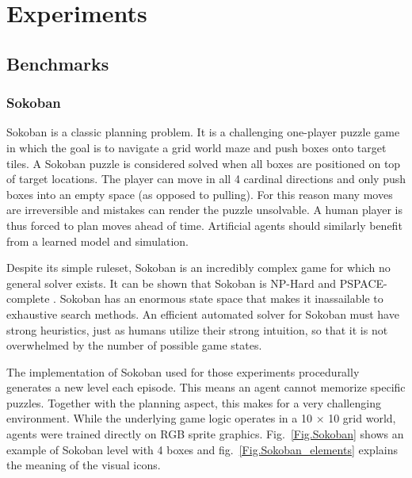 \section{Experiments}

\subsection{Benchmarks}

\subsubsection{Sokoban}

Sokoban is a classic planning problem. It is a challenging one-player puzzle game in which the goal is to navigate a grid world maze and push boxes onto target tiles. A Sokoban puzzle is considered solved when all boxes are positioned on top of target locations. The player can move in all 4 cardinal directions and only push boxes into an empty space (as opposed to pulling). For this reason many moves are irreversible and mistakes can render the puzzle unsolvable. A human player is thus forced to plan moves ahead of time. Artificial agents should similarly benefit from a learned model and simulation.

Despite its simple ruleset, Sokoban is an incredibly complex game for which no general solver exists. It can be shown that Sokoban is NP-Hard and PSPACE-complete\cite{Theory.Sokoban} . Sokoban has an enormous state space that makes it inassailable to exhaustive search methods. An efficient automated solver for Sokoban must have strong heuristics, just as humans utilize their strong intuition, so that it is not overwhelmed by the number of possible game states.

The implementation of Sokoban\cite{Code.Sokoban} used for those experiments procedurally generates a new level each episode. This means an agent cannot memorize specific puzzles. Together with the planning aspect, this makes for a very challenging environment. While the underlying game logic operates in a 10 × 10 grid world, agents were trained directly on RGB sprite graphics. Fig.~\ref{Fig.Sokoban} shows an example of Sokoban level with 4 boxes and fig.~\ref{Fig.Sokoban_elements} explains the meaning of the visual icons.


